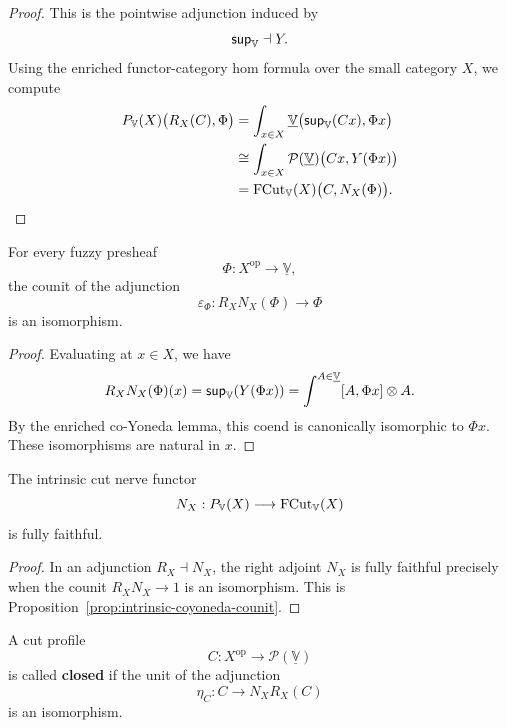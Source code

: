 \begin{proof}
    This is the pointwise adjunction induced by
    \[
        \mathsf{sup}_{\mathbb V}\dashv Y.
    \]
    Using the enriched functor-category hom formula over the small category \(X\), we compute
    \begin{align*}
        P_{\mathbb V}(X)\bigl(R_X(C),\Phi\bigr)
        &=
        \int_{x\in X}
        \underline{\mathbb V}
        \bigl(\mathsf{sup}_{\mathbb V}(C x),\Phi x\bigr)
        \\
        &\cong
        \int_{x\in X}
        \mathcal P(\underline{\mathbb V})
        \bigl(C x,Y(\Phi x)\bigr)
        \\
        &=
        \operatorname{FCut}_{\mathbb V}(X)\bigl(C,N_X(\Phi)\bigr).
    \end{align*}
\end{proof}

\begin{proposition}
\label{prop:intrinsic-coyoneda-counit}
    For every fuzzy presheaf
    \[
        \Phi:X^{\mathrm{op}}\to\underline{\mathbb V},
    \]
    the counit of the adjunction
    \[
        \varepsilon_\Phi:
        R_XN_X(\Phi)\longrightarrow \Phi
    \]
    is an isomorphism.
\end{proposition}

\begin{proof}
    Evaluating at \(x\in X\), we have
    \[
        R_XN_X(\Phi)(x)
        =
        \mathsf{sup}_{\mathbb V}(Y(\Phi x))
        =
        \int^{A\in\underline{\mathbb V}}
        [A,\Phi x]\otimes A.
    \]
    By the enriched co-Yoneda lemma, this coend is canonically isomorphic to \(\Phi x\). These isomorphisms are natural in \(x\).
\end{proof}

\begin{corollary}
\label{cor:intrinsic-cut-nerve-fully-faithful}
    The intrinsic cut nerve functor
    \[
        N_X:
        P_{\mathbb V}(X)
        \longrightarrow
        \operatorname{FCut}_{\mathbb V}(X)
    \]
    is fully faithful.
\end{corollary}

\begin{proof}
    In an adjunction \(R_X\dashv N_X\), the right adjoint \(N_X\) is fully faithful precisely when the counit \(R_XN_X\to 1\) is an isomorphism. This is Proposition~\ref{prop:intrinsic-coyoneda-counit}.
\end{proof}

\begin{definition}
\label{def:closed-cut-profile}
    A cut profile
    \[
        C:X^{\mathrm{op}}\to\mathcal P(\underline{\mathbb V})
    \]
    is called \textbf{closed} if the unit of the adjunction
    \[
        \eta_C:C\longrightarrow N_XR_X(C)
    \]
    is an isomorphism.
\end{definition}

